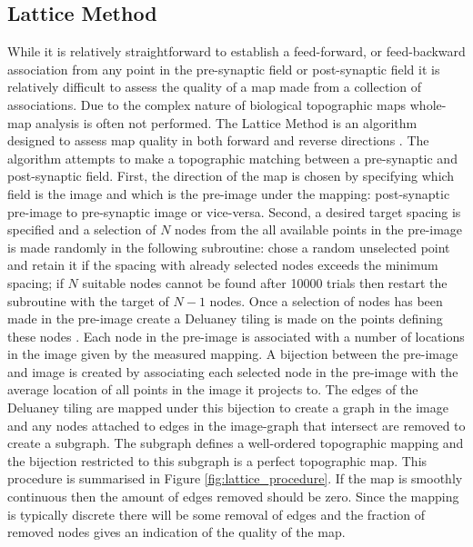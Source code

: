\subsection{Lattice Method \label{sec:lattice}}
While it is relatively straightforward to establish a feed-forward, or feed-backward association from any point in the pre-synaptic field or post-synaptic field it is relatively difficult to assess the quality of a map made from a collection of associations. Due to the complex nature of biological topographic maps whole-map analysis is often not performed. The Lattice Method is an algorithm designed to assess map quality in both forward and reverse directions \cite{Willshaw2014-ms}. The algorithm attempts to make a topographic matching between a pre-synaptic and post-synaptic field. First, the direction of the map is chosen by specifying which field is the image and which is the pre-image under the mapping: post-synaptic pre-image to pre-synaptic image or vice-versa. Second, a desired target spacing is specified and a selection of $N$ nodes from the all available points in the pre-image is made randomly in the following subroutine: chose a random unselected point and retain it if the spacing with already selected nodes exceeds the minimum spacing; if $N$ suitable nodes cannot be found after 10000 trials then restart the subroutine with the target of $N-1$ nodes. Once a selection of nodes has been made in the pre-image create a Deluaney tiling is made on the points defining these nodes \cite{Lee1980-wr}.  Each node in the pre-image is associated with a number of locations in the image given by the measured mapping. A bijection between the pre-image and image is created by associating each selected node in the pre-image with the average location of all points in the image it projects to. The edges of the Deluaney tiling are mapped under this bijection to create a graph in the image and any nodes attached to edges in the image-graph that intersect are removed to create a subgraph. The subgraph defines a well-ordered topographic mapping and the bijection restricted to this subgraph is a perfect topographic map. This procedure is summarised in Figure \ref{fig:lattice_procedure}. If the map is smoothly continuous then the amount of edges removed should be zero. Since the mapping is typically discrete there will be some removal of edges and the fraction of removed nodes gives an indication of the quality of the map.
